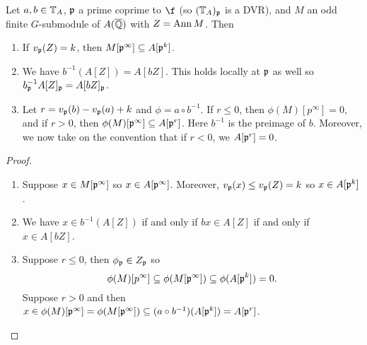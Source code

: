 \documentclass{article}
\begin{document}
\begin{lemma}\label{lem:com_alg}
    Let $a,b\in \mathbb{T}_A$, $\mathfrak{p}$ a prime coprime to $\f$ (so $(\mathbb{T}_A)_{\mathfrak{p}}$ is a
    DVR), and $M$ an odd finite $G$-submodule of $A(\overline{\mathbb{Q}})$ with $Z=\operatorname{Ann} M$.
    Then
    \begin{enumerate}
        \item 
            If $v_{\mathfrak{p}}(Z) = k$, then $M[\mathfrak{p}^\infty]\subseteq A[\mathfrak{p}^k]$.
        \item
            We have $b^{-1}(A[Z])=A[bZ]$. This holds locally at $\mathfrak{p}$ as well so
            $b_{\mathfrak{p}} ^{-1} A[Z]_{\mathfrak{p}} = A[bZ]_{\mathfrak{p}}$.
        \item
            Let $r=v_{\mathfrak{p}}(b)-v_{\mathfrak{p}}(a)+k$ and $\phi=a\circ b^{-1}$. If $r\leq
            0$, then $\phi(M)[p^\infty]=0$, and if $r>0$, then
            $\phi(M)[\mathfrak{p}^\infty]\subseteq A[\mathfrak{p}^r]$. Here $b^{-1}$ is the
            preimage of $b$. Moreover, we now take on the convention that if
            $r<0$, we $A[\mathfrak{p}^r]=0$.
    \end{enumerate}
\end{lemma}
\begin{proof}
    \mbox{}
    \begin{enumerate}
        \item 
            Suppose $x\in M[\mathfrak{p}^\infty]$ so $x\in A[\mathfrak{p}^\infty]$. Moreover,
            $v_{\mathfrak{p}}(x) \leq v_{\mathfrak{p}}(Z) = k$ so $x\in A[\mathfrak{p}^k]$.
        \item
            We have $x\in b^{-1}(A[Z])$ if and only if $bx \in A[Z]$ if and
            only if $x\in A[bZ]$.
        \item
            Suppose $r\leq 0$, then $\phi_{\mathfrak{p}} \in Z_{\mathfrak{p}}$ so
            \[
                \phi(M)[p^\infty]\subseteq \phi(M[\mathfrak{p}^\infty])
                \subseteq \phi(A[\mathfrak{p}^k]) = 0.
            \]
            Suppose $r>0$ and then $x\in \phi(M)[\mathfrak{p}^\infty] =
            \phi(M[\mathfrak{p}^\infty])\subseteq (a\circ
            b^{-1})(A[\mathfrak{p}^k])=A[\mathfrak{p}^r]$.
    \end{enumerate}
\end{proof}
\end{document}

